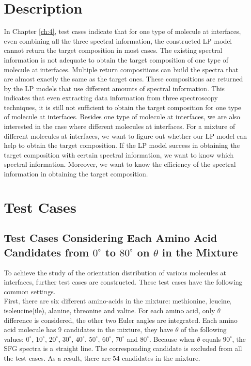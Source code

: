  \label{ch:5}
\section{Description}

In Chapter \ref{ch:4}, test cases indicate that for one type of molecule at interfaces, even combining all the three spectral information, the constructed LP model cannot return the target composition in most cases. The existing spectral information is not adequate to obtain the target composition of one type of molecule at interfaces. Multiple return compositions can build the spectra that are almost exactly the same as the target ones. These compositions are returned by the LP models that use different amounts of spectral information. This indicates that even extracting data information from three spectroscopy techniques, it is still not sufficient to obtain the target composition for one type of molecule at interfaces. Besides one type of molecule at interfaces, we are also interested in the case where different molecules at interfaces. For a mixture of different molecules at interfaces, we want to figure out whether our LP model can help to obtain the target composition. If the LP model success in obtaining the target composition with certain spectral information, we want to know which spectral information. Moreover, we want to know the efficiency of the spectral information in obtaining the target composition. \\

\section{Test Cases}
\subsection{Test Cases Considering Each Amino Acid Candidates from $0^{\circ}$ to $80^{\circ}$ on $\theta$ in the Mixture}
To achieve the study of the orientation distribution of various molecules at interfaces, further test cases are constructed. These test cases have the following common settings. \\

First, there are six different amino-acids in the mixture: methionine, leucine, isoleucine(ile), alanine, threonine and valine. For each amino acid, only $\theta$ difference is considered, the other two Euler angles are integrated. Each amino acid molecule has 9 candidates in the mixture, they have $\theta$ of the following values: $0^{\circ}$,  $10^{\circ}$, $20^{\circ}$, $30^{\circ}$, $40^{\circ}$, $50^{\circ}$, $60^{\circ}$, $70^{\circ}$ and $80^{\circ}$. Because when $\theta$ equals $90^{\circ}$, the SFG spectra is a straight line. The corresponding candidate is excluded from all the test cases. As a result, there are 54 candidates in the mixture. \\

